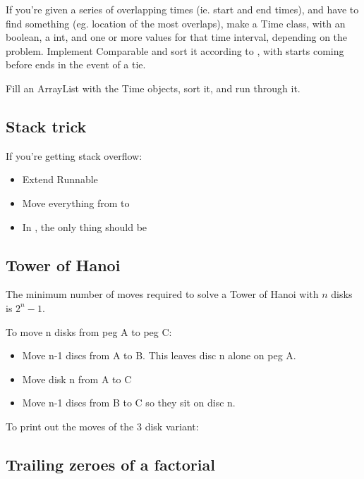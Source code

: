If you’re given a series of overlapping times (ie. start and end times), and have to find something (eg. location of the most overlaps), make a Time class, with an  boolean, a  int, and one or more values for that time interval, depending on the problem. Implement Comparable and sort it according to , with starts coming before ends in the event of a tie.

Fill an ArrayList with the Time objects, sort it, and run through it.

\subsection*{Stack trick}

If you're getting stack overflow:

\begin{itemize}
    \item Extend Runnable
    \item Move everything from  to 
    \item In , the only thing should be 
\end{itemize}

\subsection*{Tower of Hanoi}

The minimum number of moves required to solve a Tower of Hanoi with $n$ disks is $2^n - 1$.

To move n disks from peg A to peg C:

\begin{itemize}
    \item Move n-1 discs from A to B. This leaves disc n alone on peg A.
    \item Move disk n from A to C
    \item Move n-1 discs from B to C so they sit on disc n.
\end{itemize}

To print out the moves of the 3 disk variant:



\subsection*{Trailing zeroes of a factorial}

